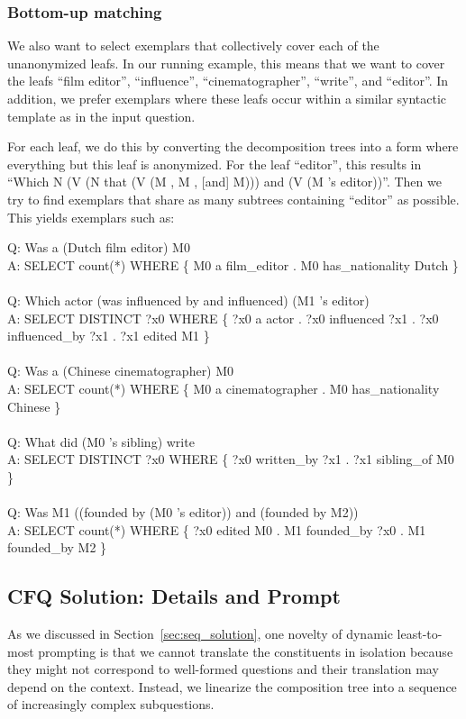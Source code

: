 \documentclass{article} \usepackage{iclr2022_conference,times}
\newcommand{\prompt}[1]{{\footnotesize \textsf{#1}}}
\begin{document}
\subsubsection{Bottom-up matching}
We also want to select exemplars that collectively cover each of the unanonymized leafs. In our running example, this means that we want to cover the leafs ``film editor'', ``influence'', ``cinematographer'', ``write'', and ``editor''. In addition, we prefer exemplars where these leafs occur within a similar syntactic template as in the input question.

For each leaf, we do this by converting the decomposition trees into a form where everything but this leaf is anonymized. For the leaf ``editor'', this results in ``Which N (V (N that (V (M , M , [and] M))) and (V (M 's editor))''. Then we try to find exemplars that share as many subtrees containing ``editor'' as possible. This yields exemplars such as:

\prompt{Q: Was a (Dutch film editor) M0 \\
A: SELECT count(*) WHERE \{ M0 a film\_editor . M0 has\_nationality Dutch \} \\
\\
Q: Which actor (was influenced by and influenced) (M1 's editor) \\
A: SELECT DISTINCT ?x0 WHERE \{ ?x0 a actor . ?x0 influenced ?x1 . ?x0 influenced\_by ?x1 . ?x1 edited M1 \} \\
\\
Q: Was a (Chinese cinematographer) M0 \\
A: SELECT count(*) WHERE \{ M0 a cinematographer . M0 has\_nationality Chinese \} \\
\\
Q: What did (M0 's sibling) write \\
A: SELECT DISTINCT ?x0 WHERE \{ ?x0 written\_by ?x1 . ?x1 sibling\_of M0 \} \\
\\
Q: Was M1 ((founded by (M0 's editor)) and (founded by M2)) \\
A: SELECT count(*) WHERE \{ ?x0 edited M0 . M1 founded\_by ?x0 . M1 founded\_by M2 \}
}

\subsection{CFQ Solution: Details and Prompt}
\label{app:cfq_solution}

As we discussed in Section~\ref{sec:seq_solution}, one novelty of dynamic least-to-most prompting is that we cannot translate the constituents in isolation because they might not correspond to well-formed questions and their translation may depend on the context. Instead, we linearize the composition tree into a sequence of increasingly complex subquestions. 
\end{document}
